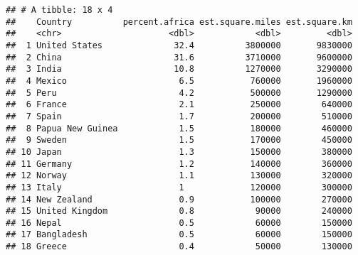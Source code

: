 \documentclass[
]{article}
\newenvironment{Shaded}{\begin{snugshade}}{\end{snugshade}}
\newcommand{\AttributeTok}[1]{\textcolor[rgb]{0.13,0.29,0.53}{#1}}
\newcommand{\CommentTok}[1]{\textcolor[rgb]{0.56,0.35,0.01}{\textit{#1}}}
\newcommand{\DecValTok}[1]{\textcolor[rgb]{0.00,0.00,0.81}{#1}}
\newcommand{\FunctionTok}[1]{\textcolor[rgb]{0.13,0.29,0.53}{\textbf{#1}}}
\newcommand{\NormalTok}[1]{#1}
\newcommand{\SpecialCharTok}[1]{\textcolor[rgb]{0.81,0.36,0.00}{\textbf{#1}}}
\begin{document}
\begin{verbatim}
## # A tibble: 18 x 4
##    Country          percent.africa est.square.miles est.square.km
##    <chr>                     <dbl>            <dbl>         <dbl>
##  1 United States              32.4          3800000       9830000
##  2 China                      31.6          3710000       9600000
##  3 India                      10.8          1270000       3290000
##  4 Mexico                      6.5           760000       1960000
##  5 Peru                        4.2           500000       1290000
##  6 France                      2.1           250000        640000
##  7 Spain                       1.7           200000        510000
##  8 Papua New Guinea            1.5           180000        460000
##  9 Sweden                      1.5           170000        450000
## 10 Japan                       1.3           150000        380000
## 11 Germany                     1.2           140000        360000
## 12 Norway                      1.1           130000        320000
## 13 Italy                       1             120000        300000
## 14 New Zealand                 0.9           100000        270000
## 15 United Kingdom              0.8            90000        240000
## 16 Nepal                       0.5            60000        150000
## 17 Bangladesh                  0.5            60000        150000
## 18 Greece                      0.4            50000        130000
\end{verbatim}

\begin{Shaded}
\end{Shaded}
\end{document}
